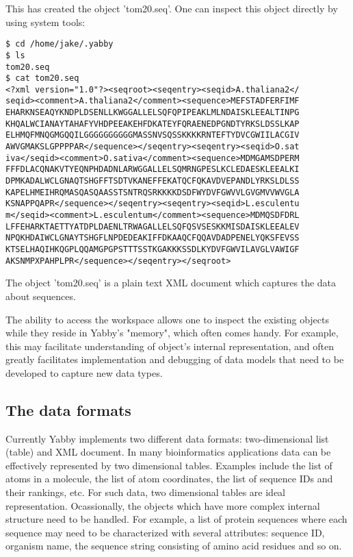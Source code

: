 This has created the object 'tom20.seq'.  One can inspect this object
directly by using system tools:

\begin{verbatim}
$ cd /home/jake/.yabby
$ ls
tom20.seq
$ cat tom20.seq
<?xml version="1.0"?><seqroot><seqentry><seqid>A.thaliana2</
seqid><comment>A.thaliana2</comment><sequence>MEFSTADFERFIMF
EHARKNSEAQYKNDPLDSENLLKWGGALLELSQFQPIPEAKLMLNDAISKLEEALTINPG
KHQALWCIANAYTAHAFYVHDPEEAKEHFDKATEYFQRAENEDPGNDTYRKSLDSSLKAP
ELHMQFMNQGMGQQILGGGGGGGGGGMASSNVSQSSKKKKRNTEFTYDVCGWIILACGIV
AWVGMAKSLGPPPPAR</sequence></seqentry><seqentry><seqid>O.sat
iva</seqid><comment>O.sativa</comment><sequence>MDMGAMSDPERM
FFFDLACQNAKVTYEQNPHDADNLARWGGALLELSQMRNGPESLKCLEDAESKLEEALKI
DPMKADALWCLGNAQTSHGFFTSDTVKANEFFEKATQCFQKAVDVEPANDLYRKSLDLSS
KAPELHMEIHRQMASQASQAASSTSNTRQSRKKKKDSDFWYDVFGWVVLGVGMVVWVGLA
KSNAPPQAPR</sequence></seqentry><seqentry><seqid>L.esculentu
m</seqid><comment>L.esculentum</comment><sequence>MDMQSDFDRL
LFFEHARKTAETTYATDPLDAENLTRWAGALLELSQFQSVSESKKMISDAISKLEEALEV
NPQKHDAIWCLGNAYTSHGFLNPDEDEAKIFFDKAAQCFQQAVDADPENELYQKSFEVSS
KTSELHAQIHKQGPLQQAMGPGPSTTTSSTKGAKKKSSDLKYDVFGWVILAVGLVAWIGF
AKSNMPXPAHPLPR</sequence></seqentry></seqroot>
\end{verbatim}

The object 'tom20.seq' is a plain text XML document which captures
the data about sequences.

The ability to access the workspace allows one to inspect the
existing objects while they reside in Yabby's "memory", which
often comes handy. For example, this may facilitate understanding
of object's internal representation, and often greatly facilitates
implementation and debugging of data models that need to be
developed to capture new data types. 

\subsection{The data formats}

Currently Yabby implements two different data formats: two-dimensional
list (table) and XML document. In many bioinformatics applications data
can be effectively represented by two dimensional tables. Examples
include the list of atoms in a molecule, the list of atom coordinates,
the list of sequence IDs and their rankings, etc. For such data, two
dimensional tables are ideal representation. Ocassionally, the objects
which have more complex internal structure need to be handled. For
example, a list of protein sequences where each sequence may need to
be characterized with several attributes: sequence ID, organism name, 
the sequence string consisting of amino acid residues and so on.


